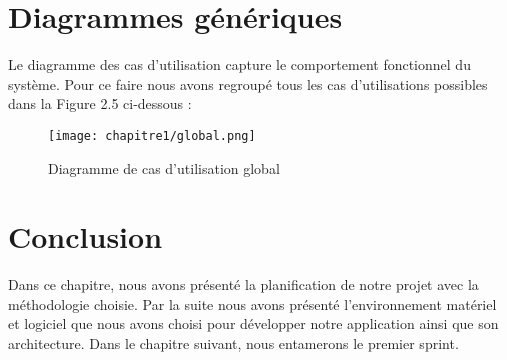 \section{Diagrammes génériques}
Le diagramme des cas d'utilisation capture le comportement fonctionnel du système. Pour ce faire nous avons regroupé tous les cas d'utilisations possibles dans la Figure 2.5 ci-dessous :

\begin{figure}[H]
\centering
\texttt{[image: chapitre1/global.png]}
\vspace{2mm} %
\caption{Diagramme de cas d'utilisation global}
\end{figure}

\section*{Conclusion}
Dans ce chapitre, nous avons présenté la planification de notre projet avec la méthodologie choisie. Par la suite nous avons présenté l'environnement matériel et logiciel que nous avons choisi pour développer notre application ainsi que son architecture. Dans le chapitre suivant, nous entamerons le premier sprint.